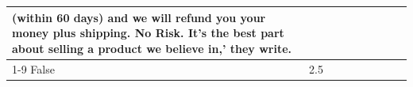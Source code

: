 \begin{table}[H]
{\begin{tabular}{lllrlllll}
(within 60 days) and we will refund you your money plus shipping. No Risk. It’s the best part about selling a product we believe in,' they write.

 \\
\cline{1-9}
False & 2.5%
\end{tabular}}
\end{table}
